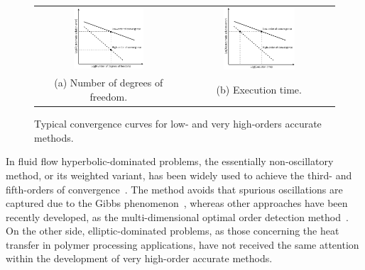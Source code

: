 \begin{figure}[!htb]
\centering
\begin{tabular}{@{}c@{}c@{}}
\includegraphics[width=0.5\textwidth]{chap1/include/tikz/error_vs_dof.pdf}
& \includegraphics[width=0.5\textwidth]{chap1/include/tikz/error_vs_time.pdf}\\
\small (a) Number of degrees of freedom. & \small (b) Execution time.
\end{tabular}
\caption{Typical convergence curves for low- and very high-orders accurate methods.}
\label{chap1:fig:computational_methods_convergence_order}
\end{figure}

In fluid flow hyperbolic-dominated problems, the essentially non-oscillatory method, or its weighted variant, has been widely used to achieve the third- and fifth-orders of convergence~\cite{chap1:1997ollivier,chap1:2002hernandez,chap1:2002ollivier,chap1:2009toro,chap1:2011ivan,chap1:2018barth}.
The method avoids that spurious oscillations are captured due to the Gibbs phenomenon~\cite{chap1:1997gottlieb}, whereas other approaches have been recently developed, as the multi-dimensional optimal order detection method~\cite{chap1:2011clain,chap1:2012diot,chap1:2013diot}.
On the other side, elliptic-dominated problems, as those concerning the heat transfer in polymer processing applications, have not received the same attention within the development of very high-order accurate methods.

